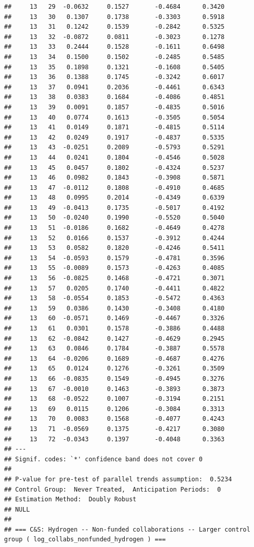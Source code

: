 \documentclass[
]{article}
\begin{document}
\begin{verbatim}
##     13   29  -0.0632     0.1527       -0.4684      0.3420 
##     13   30   0.1307     0.1738       -0.3303      0.5918 
##     13   31   0.1242     0.1539       -0.2842      0.5325 
##     13   32  -0.0872     0.0811       -0.3023      0.1278 
##     13   33   0.2444     0.1528       -0.1611      0.6498 
##     13   34   0.1500     0.1502       -0.2485      0.5485 
##     13   35   0.1898     0.1321       -0.1608      0.5405 
##     13   36   0.1388     0.1745       -0.3242      0.6017 
##     13   37   0.0941     0.2036       -0.4461      0.6343 
##     13   38   0.0383     0.1684       -0.4086      0.4851 
##     13   39   0.0091     0.1857       -0.4835      0.5016 
##     13   40   0.0774     0.1613       -0.3505      0.5054 
##     13   41   0.0149     0.1871       -0.4815      0.5114 
##     13   42   0.0249     0.1917       -0.4837      0.5335 
##     13   43  -0.0251     0.2089       -0.5793      0.5291 
##     13   44   0.0241     0.1804       -0.4546      0.5028 
##     13   45   0.0457     0.1802       -0.4324      0.5237 
##     13   46   0.0982     0.1843       -0.3908      0.5871 
##     13   47  -0.0112     0.1808       -0.4910      0.4685 
##     13   48   0.0995     0.2014       -0.4349      0.6339 
##     13   49  -0.0413     0.1735       -0.5017      0.4192 
##     13   50  -0.0240     0.1990       -0.5520      0.5040 
##     13   51  -0.0186     0.1682       -0.4649      0.4278 
##     13   52   0.0166     0.1537       -0.3912      0.4244 
##     13   53   0.0582     0.1820       -0.4246      0.5411 
##     13   54  -0.0593     0.1579       -0.4781      0.3596 
##     13   55  -0.0089     0.1573       -0.4263      0.4085 
##     13   56  -0.0825     0.1468       -0.4721      0.3071 
##     13   57   0.0205     0.1740       -0.4411      0.4822 
##     13   58  -0.0554     0.1853       -0.5472      0.4363 
##     13   59   0.0386     0.1430       -0.3408      0.4180 
##     13   60  -0.0571     0.1469       -0.4467      0.3326 
##     13   61   0.0301     0.1578       -0.3886      0.4488 
##     13   62  -0.0842     0.1427       -0.4629      0.2945 
##     13   63   0.0846     0.1784       -0.3887      0.5578 
##     13   64  -0.0206     0.1689       -0.4687      0.4276 
##     13   65   0.0124     0.1276       -0.3261      0.3509 
##     13   66  -0.0835     0.1549       -0.4945      0.3276 
##     13   67  -0.0010     0.1463       -0.3893      0.3873 
##     13   68  -0.0522     0.1007       -0.3194      0.2151 
##     13   69   0.0115     0.1206       -0.3084      0.3313 
##     13   70   0.0083     0.1568       -0.4077      0.4243 
##     13   71  -0.0569     0.1375       -0.4217      0.3080 
##     13   72  -0.0343     0.1397       -0.4048      0.3363 
## ---
## Signif. codes: `*' confidence band does not cover 0
## 
## P-value for pre-test of parallel trends assumption:  0.5234
## Control Group:  Never Treated,  Anticipation Periods:  0
## Estimation Method:  Doubly Robust
## NULL
## 
## === C&S: Hydrogen -- Non-funded collaborations -- Larger control group ( log_collabs_nonfunded_hydrogen ) ===
\end{verbatim}
\end{document}
